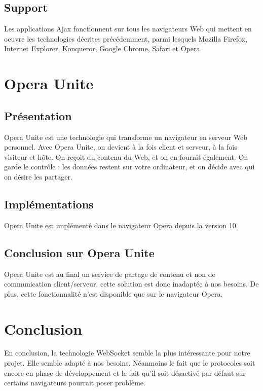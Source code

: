 \documentclass[a4paper,10pt]{report}
\begin{document}
  \subsection{Support}

Les applications Ajax fonctionnent sur tous les navigateurs Web qui mettent en oeuvre les 
technologies décrites précédemment, parmi lesquels Mozilla Firefox, Internet Explorer, 
Konqueror, Google Chrome, Safari et Opera.


  \section{Opera Unite}

    \subsection{Présentation}

Opera Unite est une technologie qui transforme un navigateur en serveur 
Web personnel. Avec Opera Unite, on devient à la fois client et serveur, 
à la fois visiteur et hôte. On reçoit du contenu du Web, et on en fournit 
également. On garde le contrôle : les données restent sur votre ordinateur, 
et on décide avec qui on désire les partager. 

    \subsection{Implémentations}

Opera Unite est implémenté dans le navigateur Opera depuis la version 10.


    \subsection{Conclusion sur Opera Unite}

Opera Unite est au final un service de partage de contenu et non de 
communication client/serveur, cette solution est donc inadaptée à nos 
besoins. De plus, cette fonctionnalité n'est disponible que sur le 
navigateur Opera.

  \section{Conclusion}

En conclusion, la technologie WebSocket semble la plus intéressante pour notre projet.
Elle semble adapté à nos besoins. Néanmoins le fait que le protocoles soit 
encore en phase de développement et le fait qu'il soit désactivé par défaut 
sur certains navigateurs pourrait poser problème.
\end{document}
